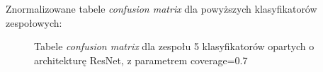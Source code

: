 \documentclass[polish,12pt]{aghthesis}
\begin{document}
\noindent Znormalizowane tabele \textit{confusion matrix} dla powyższych klasyfikatorów zespołowych:
\begin{figure}[H]%
    \begin{adjustbox}{minipage=1.0\paperwidth, pagecenter}
    \centering
    \qquad
    \end{adjustbox}
    \label{fig:resnet-ens-5-0.7-matrices}
    \caption{Tabele \textit{confusion matrix} dla zespołu 5 klasyfikatorów opartych o architekturę ResNet, z parametrem coverage=0.7}
\end{figure}
\end{document}
